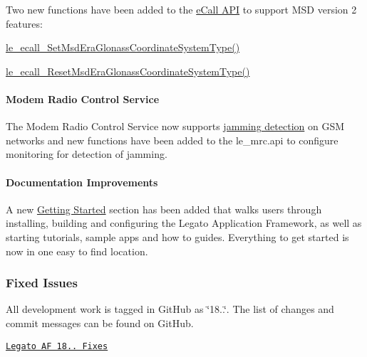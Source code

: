 Two new functions have been added to the \hyperlink{c_ecall}{e\+Call A\+PI} to support M\+SD version 2 features\+:
\begin{DoxyItemize}
\item \hyperlink{le__ecall__interface_8h_aba15bc78d2e03b5bf8c16ee366fb39b9}{le\+\_\+ecall\+\_\+\+Set\+Msd\+Era\+Glonass\+Coordinate\+System\+Type()}
\item \hyperlink{le__ecall__interface_8h_a7ca8cd2cfbf76310d1e65d34dfc3b220}{le\+\_\+ecall\+\_\+\+Reset\+Msd\+Era\+Glonass\+Coordinate\+System\+Type()}
\end{DoxyItemize}\hypertarget{releaseNotes18020_rn1802_Features_jammingDectection}{}\paragraph{Modem Radio Control Service}\label{releaseNotes18020_rn1802_Features_jammingDectection}
The Modem Radio Control Service now supports \hyperlink{c_mrc_le_mrc_jamming}{jamming detection} on G\+SM networks and new functions have been added to the le\+\_\+mrc.api to configure monitoring for detection of jamming.\hypertarget{releaseNotes18020_rn1802_Features_docs}{}\paragraph{Documentation Improvements}\label{releaseNotes18020_rn1802_Features_docs}
A new \hyperlink{getStarted}{Getting Started} section has been added that walks users through installing, building and configuring the Legato Application Framework, as well as starting tutorials, sample apps and how to guides. Everything to get started is now in one easy to find location.\hypertarget{releaseNotes18020_rn1802_Fixes}{}\subsubsection{Fixed Issues}\label{releaseNotes18020_rn1802_Fixes}
All development work is tagged in Git\+Hub as \char`\"{}18..\char`\"{}. The list of changes and commit messages can be found on Git\+Hub.


\begin{DoxyItemize}
\item \href{https://github.com/legatoproject/legato-af/commits/18.02.0}{\tt Legato AF 18.. Fixes}
\end{DoxyItemize}

